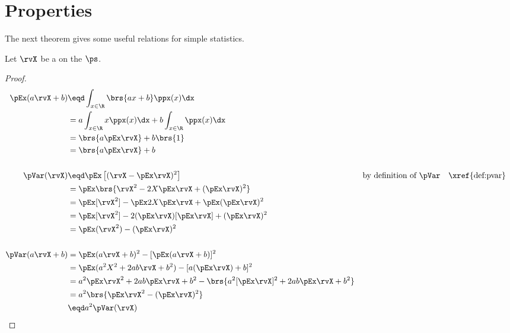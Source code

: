 \section{Properties}
The next theorem gives some useful relations for simple statistics.
\begin{theorem}
\label{thm:pE}
Let $\rvX$ be a  on the  $\ps$.
\end{theorem}
\begin{proof}
\begin{align*}
  \pEx(a\rvX+b)
    &\eqd \int_{x\in\R}\brs{ax+b} \ppx(x)  \dx
  \\&=    a \int_{x\in\R}x \ppx(x)  \dx + b\int_{x\in\R}\ppx(x)  \dx
  \\&= \brs{a\pEx\rvX} + b\brs{1}
  \\&= \brs{a\pEx\rvX} + b
\\
\\
  \pVar(\rvX)
    &\eqd \pEx\left[(\rvX-\pEx\rvX)^2\right]
    &&    \text{by definition of $\pVar$}
    &&    \text{\xref{def:pvar}}
  \\&=    \pEx\brs{\rvX^2-2X\pEx\rvX + (\pEx\rvX)^2 }
  \\&=    \pEx[\rvX^2]  - \pEx 2X\pEx\rvX  + \pEx (\pEx\rvX)^2
  \\&=    \pEx[\rvX^2] - 2(\pEx\rvX)[\pEx\rvX] + (\pEx\rvX)^2
  \\&=    \pEx(\rvX^2) - (\pEx\rvX)^2
\\
\\
  \pVar(a\rvX+b)
    &=    \pEx(a\rvX+b)^2  - [\pEx(a\rvX+b)]^2
  \\&=    \pEx(a^2X^2+2ab\rvX+b^2)  - [a(\pEx\rvX)+b]^2
  \\&=    a^2 \pEx\rvX^2  +2ab\pEx\rvX + b^2 - \brs{a^2[\pEx\rvX]^2 + 2ab\pEx\rvX + b^2}
  \\&=    a^2\brs{ \pEx\rvX^2  - (\pEx\rvX)^2 }
  \\&\eqd a^2 \pVar(\rvX)
\end{align*}
\end{proof}

